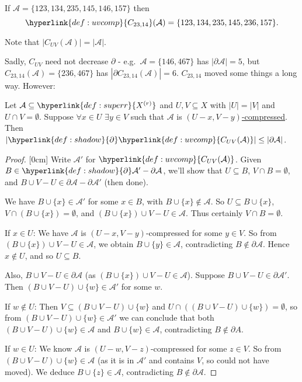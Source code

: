\documentclass{article}
\newcommand{\A}{\mathcal{A}}
\let\subset\subseteq
\begin{document}
\begin{eg}
  If $\mathcal{A} = \{123,134,235,145,146,157\}$ then
  \begin{equation*}\hyperlink{def:uvcomp}{C_{23,14}}(\mathcal{A}) = \{123,134,235,145,236,157\}.\end{equation*}
\end{eg}
Note that $|C_{UV}(\mathcal{A})| = |\mathcal{A}|$.

Sadly, \hyperlink{def:uvcomp}{$C_{UV}$} need not decrease \hyperlink{def:shadow}{$\partial$} - e.g.\ $\mathcal{A} = \{146,467\}$ has $|\partial\mathcal{A}| = 5$, but $C_{23,14}(\mathcal{A}) = \{236,467\}$ has $|\partial C_{23,14}(\mathcal{A})| = 6$.
$C_{23,14}$ moved some things a long way.
However:
\begin{nprop}\label{prop:6}
  Let $\mathcal{A} \subset \hyperlink{def:superr}{X^{(r)}}$ and $U,V \subseteq X$ with $|U| = |V|$ and $U \cap V = \emptyset$.
  Suppose $\forall x \in U$ $\exists y \in V$ such that $\mathcal{A}$ is \hyperlink{def:uvcomp}{$(U-x, V-y)$-compressed}.
  Then $|\hyperlink{def:shadow}{\partial} \hyperlink{def:uvcomp}{C_{UV}(\mathcal{A})}| \leq |\partial \mathcal{A}|$.
\end{nprop}
\begin{proof}
  [0cm]
  \color{gray}
  Write $\mathcal{A}'$ for $\hyperlink{def:uvcomp}{C_{UV}(\mathcal{A})}$.
  Given $B \in \hyperlink{def:shadow}{\partial} \A' - \partial \A$, we'll show that $U \subset B$, $V \cap B = \emptyset$, and $B \cup V - U \in \partial \A - \partial \A'$ (then done).

  We have $B \cup \{x\} \in \mathcal{A}'$ for some $x \in B$, with $B \cup \{x\} \notin \mathcal{A}$.
  So $U \subset B \cup \{x\}$, $V \cap (B \cup \{x\}) = \emptyset$, and $(B \cup \{x\}) \cup V - U \in \mathcal{A}$.
  Thus certainly $V \cap B = \emptyset$.\bigskip

  If $x \in U$: We have $\mathcal{A}$ is $(U-x,V-y)$-compressed for some $y \in V$.
  So from $(B \cup \{x\}) \cup V - U \in \mathcal{A}$, we obtain $B \cup \{y\} \in \mathcal{A}$,
  contradicting $B \notin \partial \mathcal{A}$.
  Hence $x \notin U$, and so $U \subset B$. \bigskip

  Also, $B \cup V - U \in \partial \mathcal{A}$ (as $(B \cup \{x\}) \cup V - U \in \mathcal{A}$).
  Suppose $B \cup V - U \in \partial \mathcal{A}'$.
  Then $(B \cup V - U) \cup \{w\} \in \mathcal{A}'$ for some $w$.

  If $w \notin U$: Then $V \subset (B \cup V - U) \cup \{w\}$ and $U \cap ((B \cup V - U) \cup \{w\}) = \emptyset$, so from $(B \cup V - U) \cup \{w\} \in \mathcal{A}'$ we can conclude that both $(B \cup V - U) \cup \{w\} \in \mathcal{A}$ and $B \cup \{w\} \in \mathcal{A}$, contradicting $B \notin \partial A.$

  If $w \in U$: We know $\mathcal{A}$ is $(U-w,V-z)$-compressed for some $z \in V$.
  So from $(B \cup V - U) \cup \{w\} \in \mathcal{A}$ (as it is in $\mathcal{A}'$ and contains $V$, so could not have moved).
  We deduce $B \cup \{z\} \in \mathcal{A}$, contradicting $B \notin \partial \mathcal{A}$.
\end{proof}
\end{document}
